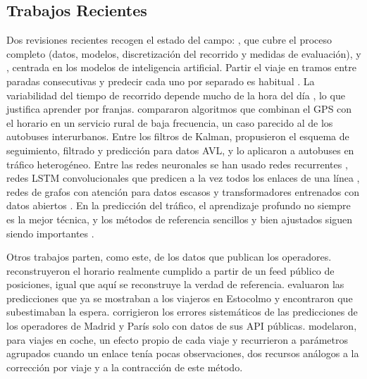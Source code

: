 \subsection{Trabajos Recientes} Dos revisiones recientes recogen el estado del campo: \citet{kumar2025review}, que cubre
el proceso completo (datos, modelos, discretización del recorrido y medidas de evaluación), y
\citet{singh2022review}, centrada en los modelos de inteligencia artificial. Partir el viaje en tramos entre paradas
consecutivas y predecir cada uno por separado es habitual \citep{gal2017journey}. La variabilidad del tiempo de
recorrido depende mucho de la hora del día \citep{mazloumi2010variability}, lo que justifica aprender por franjas.
\citet{lin1999experimental} compararon algoritmos que combinan el GPS con el horario en un servicio rural de baja
frecuencia, un caso parecido al de los autobuses interurbanos. Entre los filtros de Kalman, \citet{cathey2003prescription} propusieron el esquema de
seguimiento, filtrado y predicción para datos AVL, y \citet{vanajakshi2009kalman} lo aplicaron a autobuses en tráfico
heterogéneo. Entre las redes neuronales se han usado redes recurrentes \citep{pang2019rnn}, redes LSTM convolucionales
que predicen a la vez todos los enlaces de una línea \citep{petersen2019convlstm}, redes de grafos con atención para
datos escasos \citep{ma2022multiattention} y transformadores entrenados con datos abiertos
\citep{jeong2024battransformer}. En la predicción del tráfico, el aprendizaje profundo no siempre es la mejor técnica,
y los métodos de referencia sencillos y bien ajustados siguen siendo importantes \citep{manibardo2022deep}.

Otros trabajos parten, como este, de los datos que publican los operadores. \citet{wessel2017retrospective}
reconstruyeron el horario realmente cumplido a partir de un feed público de posiciones, igual que aquí se reconstruye
la verdad de referencia. \citet{cats2016realtime} evaluaron las predicciones que ya se mostraban a los viajeros en
Estocolmo y encontraron que subestimaban la espera. \citet{garciamaurino2024improving} corrigieron los errores
sistemáticos de las predicciones de los operadores de Madrid y París solo con datos de sus API públicas.
\citet{woodard2017predicting} modelaron, para viajes en coche, un efecto propio de cada viaje y recurrieron a
parámetros agrupados cuando un enlace tenía pocas observaciones, dos recursos análogos a la corrección por viaje y a la
contracción de este método.

